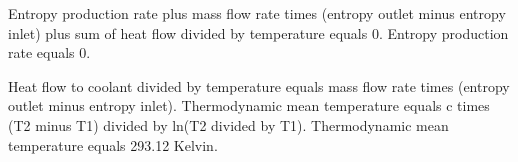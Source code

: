 Entropy production rate plus mass flow rate times (entropy outlet minus entropy inlet) plus sum of heat flow divided by temperature equals 0.  
Entropy production rate equals 0.  

Heat flow to coolant divided by temperature equals mass flow rate times (entropy outlet minus entropy inlet).  
Thermodynamic mean temperature equals c times (T2 minus T1) divided by ln(T2 divided by T1).  
Thermodynamic mean temperature equals 293.12 Kelvin.